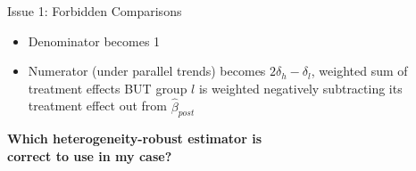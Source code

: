 \documentclass{beamer}
\begin{document}
\begin{frame}[allowframebreaks]{Issue 1: Forbidden Comparisons}
\begin{itemize}
        \item Denominator becomes 1
        \item Numerator (under parallel trends) becomes $2\delta_{h} - \delta_{l}$, weighted sum of treatment effects BUT group $l$ is weighted negatively subtracting its treatment effect out from $\hat{\beta}_{post}$

    \end{itemize}

    \begin{center}
        \textbf{Which heterogeneity-robust estimator is \\ correct to use in my case?}
    \end{center}

\end{frame}

\end{document}

